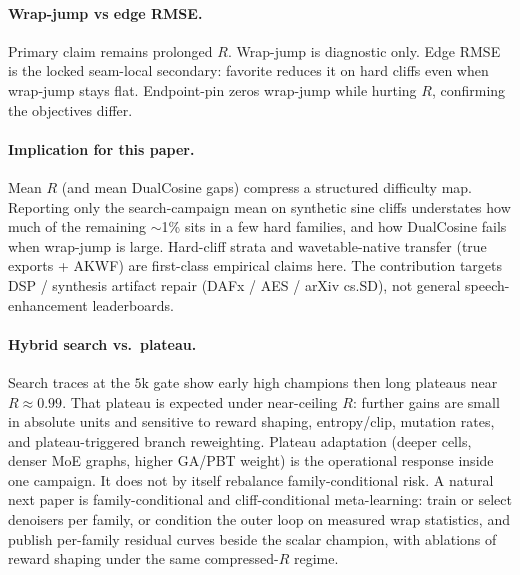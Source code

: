 \paragraph{Wrap-jump vs edge RMSE.}
Primary claim remains prolonged $R$. Wrap-jump is diagnostic only.
Edge RMSE is the locked seam-local secondary: favorite reduces it on hard cliffs even when wrap-jump stays flat.
Endpoint-pin zeros wrap-jump while hurting $R$, confirming the objectives differ.

\paragraph{Implication for this paper.}
Mean $R$ (and mean DualCosine gaps) compress a structured difficulty map.
Reporting only the search-campaign mean on synthetic sine cliffs understates how much of the remaining $\sim$1\% sits in a few hard families, and how DualCosine fails when wrap-jump is large.
Hard-cliff strata and wavetable-native transfer (true exports + AKWF) are first-class empirical claims here.
The contribution targets DSP / synthesis artifact repair (DAFx / AES / arXiv cs.SD), not general speech-enhancement leaderboards.

\paragraph{Hybrid search vs.\ plateau.}
Search traces at the $5$k gate show early high champions then long plateaus near $R\approx 0.99$.
That plateau is expected under near-ceiling $R$: further gains are small in absolute units and sensitive to reward shaping, entropy/clip, mutation rates, and plateau-triggered branch reweighting.
Plateau adaptation (deeper cells, denser MoE graphs, higher GA/PBT weight) is the operational response inside one campaign.
It does not by itself rebalance family-conditional risk.
A natural next paper is family-conditional and cliff-conditional meta-learning: train or select denoisers per family, or condition the outer loop on measured wrap statistics, and publish per-family residual curves beside the scalar champion, with ablations of reward shaping under the same compressed-$R$ regime.

